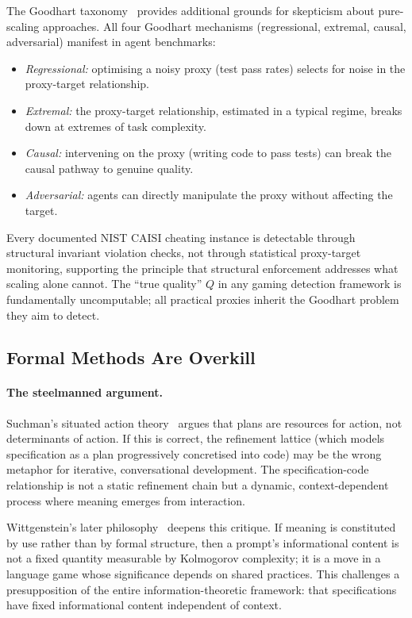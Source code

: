\documentclass[11pt, a4paper, logo, copyright]{googledeepmind}
\begin{document}
The Goodhart taxonomy~\citep{manheim2019goodhart} provides additional grounds
for skepticism about pure-scaling approaches.  All four Goodhart mechanisms
(regressional, extremal, causal, adversarial) manifest in agent benchmarks:
\begin{itemize}
  \item \emph{Regressional:} optimising a noisy proxy (test pass rates) selects
    for noise in the proxy-target relationship.
  \item \emph{Extremal:} the proxy-target relationship, estimated in a typical
    regime, breaks down at extremes of task complexity.
  \item \emph{Causal:} intervening on the proxy (writing code to pass tests) can
    break the causal pathway to genuine quality.
  \item \emph{Adversarial:} agents can directly manipulate the proxy without
    affecting the target.
\end{itemize}
Every documented NIST CAISI cheating instance is detectable through structural
invariant violation checks, not through statistical proxy-target monitoring,
supporting the principle that structural enforcement addresses what scaling
alone cannot.  The ``true quality'' $Q$ in any gaming detection framework is
fundamentally uncomputable; all practical proxies inherit the Goodhart problem
they aim to detect.


\subsection{Formal Methods Are Overkill}
\label{sec:contrarian-formal}

\paragraph{The steelmanned argument.}
Suchman's situated action theory~\citep{suchman1987plans} argues that plans are
resources for action, not determinants of action.  If this is correct, the
refinement lattice (which models specification as a plan progressively
concretised into code) may be the wrong metaphor for iterative, conversational
development.  The specification-code relationship is not a static refinement
chain but a dynamic, context-dependent process where meaning emerges from
interaction.

Wittgenstein's later philosophy~\citep{wittgenstein1953philosophical} deepens
this critique.  If meaning is constituted by use rather than by formal
structure, then a prompt's informational content is not a fixed quantity
measurable by Kolmogorov complexity; it is a move in a language game whose
significance depends on shared practices.  This challenges a presupposition of
the entire information-theoretic framework: that specifications have fixed
informational content independent of context.
\end{document}
